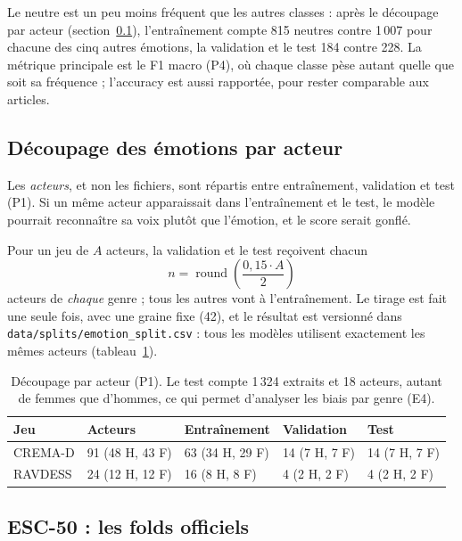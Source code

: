 Le neutre est un peu moins fréquent que les autres classes : après le découpage par acteur
(section~\ref{sec:p1}), l'entraînement compte 815 neutres contre 1\,007 pour chacune des cinq
autres émotions, la validation et le test 184 contre 228. La métrique principale est le F1
macro (P4), où chaque classe pèse autant quelle que soit sa fréquence ; l'accuracy est aussi
rapportée, pour rester comparable aux articles.

\subsection{Découpage des émotions par acteur}
\label{sec:p1}

Les \emph{acteurs}, et non les fichiers, sont répartis entre entraînement, validation et test
(P1). Si un même acteur apparaissait dans l'entraînement et le test, le modèle pourrait
reconnaître sa voix plutôt que l'émotion, et le score serait gonflé.

Pour un jeu de $A$ acteurs, la validation et le test reçoivent chacun
\begin{equation}
  n = \operatorname{round}\!\left(\frac{0{,}15 \cdot A}{2}\right)
\end{equation}
acteurs de \emph{chaque} genre ; tous les autres vont à l'entraînement. Le tirage est fait une
seule fois, avec une graine fixe (42), et le résultat est versionné dans
\texttt{data/splits/emotion\_split.csv} : tous les modèles utilisent exactement les mêmes
acteurs (tableau~\ref{tab:p1}).

\begin{table}[ht]
  \centering
  \small
  \begin{tabular}{@{}lllll@{}}
    \toprule
    Jeu & Acteurs & Entraînement & Validation & Test \\
    \midrule
    CREMA-D & 91 (48 H, 43 F) & 63 (34 H, 29 F) & 14 (7 H, 7 F) & 14 (7 H, 7 F) \\
    RAVDESS & 24 (12 H, 12 F) & 16 (8 H, 8 F)   & 4 (2 H, 2 F)  & 4 (2 H, 2 F) \\
    \bottomrule
  \end{tabular}
  \caption{Découpage par acteur (P1). Le test compte 1\,324 extraits et 18 acteurs, autant de
    femmes que d'hommes, ce qui permet d'analyser les biais par genre (E4).}
  \label{tab:p1}
\end{table}

\subsection{ESC-50 : les folds officiels}
\label{sec:p3}

